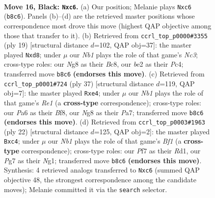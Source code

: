 \documentclass[11pt]{article}
\begin{document}
\clearpage

\begin{figure}[p]\centering
\begin{subfigure}{0.46\textwidth}\centering
\resizebox{\linewidth}{!}{%
\newchessgame
\chessboard[
  setfen={rn2k1nr/5ppp/p1Q5/4P2b/7P/1P3N2/P3BKP1/RN5R b kq - 0 16},
  showmover=false,
  pgfstyle=straightmove, color=movearrow, markmove={b8-c6}
]}
\caption{}
\end{subfigure}\hfill
\begin{subfigure}{0.46\textwidth}\centering
\resizebox{\linewidth}{!}{%
\newchessgame
\chessboard[
  setfen={r1bQk2r/ppp2ppp/2n5/8/2p1P3/2N5/PP3PPP/R3KB1R b KQkq - 0 10},
  showmover=false,
  pgfstyle=straightmove, color=movearrow, markmove={c6-d8}
]}
\caption{}
\end{subfigure}
\\[4pt]
\begin{subfigure}{0.46\textwidth}\centering
\resizebox{\linewidth}{!}{%
\newchessgame
\chessboard[
  setfen={r3rbk1/p1B2ppp/8/2P5/4Q3/3n1N2/PP4PP/R4R1K b - - 0 19},
  showmover=false,
  pgfstyle=straightmove, color=movearrow, markmove={e8-e4}
]}
\caption{}
\end{subfigure}\hfill
\begin{subfigure}{0.46\textwidth}\centering
\resizebox{\linewidth}{!}{%
\newchessgame
\chessboard[
  setfen={rnb1k2r/pp2b1pp/2p5/8/2q1pP2/4B3/PPP3PP/3RKBNR w Kkq - 0 12},
  showmover=false,
  pgfstyle=straightmove, color=movearrow, markmove={f1-c4}
]}
\caption{}
\end{subfigure}
\caption{\textbf{Move 16, Black: \texttt{Nxc6}.} (a) Our position; Melanie plays \texttt{Nxc6} (\texttt{b8c6}). Panels (b)--(d) are the retrieved master positions whose correspondence most drove this move (highest QAP objective among those that transfer to it). (b) Retrieved from \texttt{ccrl\_top\_p0000\#3355} (ply 19) [structural distance $d$=102, QAP obj=37]: the master played \texttt{Nxd8}; under $\mu$ our \emph{Nb1} plays the role of that game's \emph{Nc3}; cross-type roles: our \emph{N}g8 as their \emph{B}c8, our \emph{b}e2 as their \emph{P}c4; transferred move \texttt{b8c6} \textbf{(endorses this move)}. (c) Retrieved from \texttt{ccrl\_top\_p0001\#724} (ply 37) [structural distance $d$=119, QAP obj=7]: the master played \texttt{Rxe4}; under $\mu$ our \emph{Nb1} plays the role of that game's \emph{Re1} (a \textbf{cross-type} correspondence); cross-type roles: our \emph{P}a6 as their \emph{B}f8, our \emph{N}g8 as their \emph{P}a7; transferred move \texttt{b8c6} \textbf{(endorses this move)}. (d) Retrieved from \texttt{ccrl\_top\_p0003\#1963} (ply 22) [structural distance $d$=125, QAP obj=2]: the master played \texttt{Bxc4}; under $\mu$ our \emph{Nb1} plays the role of that game's \emph{Bf1} (a \textbf{cross-type} correspondence); cross-type roles: our \emph{P}f7 as their \emph{R}d1, our \emph{P}g7 as their \emph{N}g1; transferred move \texttt{b8c6} \textbf{(endorses this move)}. Synthesis: 4 retrieved analogs transferred to \texttt{Nxc6} (summed QAP objective 48, the strongest correspondence among the candidate moves); Melanie committed it via the \texttt{search} selector.}
\label{fig:thought-m31}
\end{figure}
\end{document}
